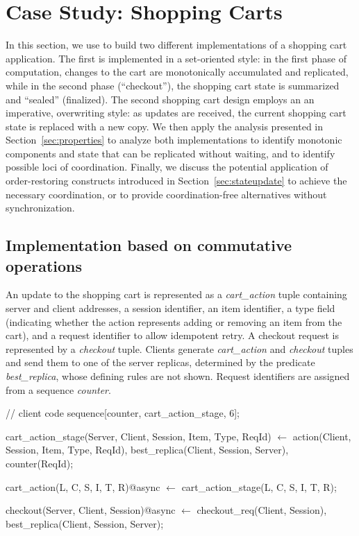 \section{Case Study: Shopping Carts}
\label{sec:casestudy}

In this section, we use \lang to build two different implementations of a 
shopping cart application.
The first is implemented in a set-oriented style: in the first phase of computation,
changes to the cart are monotonically accumulated and replicated, while in the second
phase (``checkout''), the shopping cart state is summarized and ``sealed'' (finalized).
The second shopping cart design employs an
an imperative, overwriting style: as updates are received, the current shopping cart state
is replaced with a new copy.  We then apply the analysis presented in Section~\ref{sec:properties} 
to analyze both implementations to identify monotonic 
components and state that can be replicated without waiting, and to identify possible
loci of coordination.  Finally, we discuss the potential application of order-restoring
constructs introduced in Section~\ref{sec:stateupdate} to achieve the necessary coordination,
or to provide coordination-free alternatives without synchronization.

\subsection{Implementation based on commutative operations}
An update to the shopping cart is represented as a {\em cart\_action} tuple
containing server and client addresses, a session identifier, an item
identifier, a type field (indicating whether the action represents adding
or removing an item from the cart), and a request identifier to allow
idempotent retry. A checkout request is represented by a {\em checkout}
tuple.  Clients generate {\em cart\_action} and {\em checkout} tuples
and send them to one of the server replicas, determined
by the predicate {\em best\_replica}, whose defining rules are not shown. 
Request identifiers are assigned from a sequence {\em counter}.

\begin{Dedalus}
// client code
sequence[counter, cart_action_stage, 6];

cart_action_stage(Server, Client, Session,
                  Item, Type, ReqId) \(\leftarrow\)
    action(Client, Session, Item, Type, ReqId),
    best_replica(Client, Session, Server),
    counter(ReqId);

cart_action(L, C, S, I, T, R)@async \(\leftarrow\)
    cart_action_stage(L, C, S, I, T, R);

checkout(Server, Client, Session)@async \(\leftarrow\)
    checkout_req(Client, Session),
    best_replica(Client, Session, Server);
\end{Dedalus}


